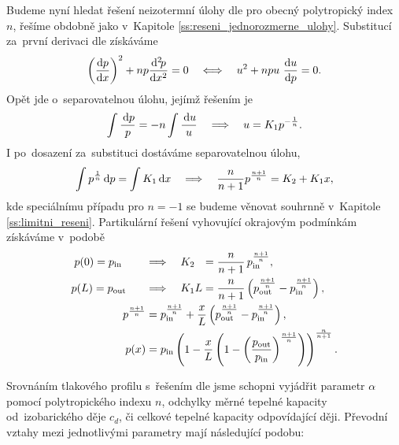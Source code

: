 Budeme nyní hledat řešení neizotermní úlohy dle  pro obecný polytropický index $n$, řešíme obdobně jako v~Kapitole \ref{ss:reseni_jednorozmerne_ulohy}. Substitucí za~první derivaci dle  získáváme
\begin{equation}
    \left(\frac{\mathrm{d} p}{\mathrm{d} x}\right)^2 + n p\frac{\mathrm{d}^2 \! p}{\mathrm{d} x^2}=0\quad\Longleftrightarrow\quad u^2 + n p u~\frac{\mathrm{d} u}{\mathrm{d} p}=0.
\end{equation}
Opět jde o~separovatelnou úlohu, jejímž řešením je
\begin{equation}
    \int \frac{\,\mathrm{d}{p}}{p}=-n \int \frac{\,\mathrm{d}{u}}{u}\quad\Longrightarrow\quad u=K_1 p^{-\frac{1}{n}}.
\end{equation}
I po~dosazení za~substituci dostáváme separovatelnou úlohu,
\begin{equation}
    \int p^{\frac{1}{n}}\,\mathrm{d}{p}=\int K_1 \,\mathrm{d}{x}\quad\Longrightarrow \quad
    \frac{n}{n+1}p^{\frac{n+1}{n}}=K_2 + K_1 x,
\end{equation}
kde speciálnímu případu pro $n=-1$ se budeme věnovat souhrnně v~Kapitole \ref{ss:limitni_reseni}.
Partikulární řešení vyhovující okrajovým podmínkám získáváme v~podobě
\begin{subequations}
    \begin{align}
        p(0)=p_{\mathrm{in\hphantom{out}}}\quad&\Longrightarrow\quad {K_2 \hphantom{L}}
        =\frac{n}{n+1}\,p_{\mathrm{in}}^{\frac{n+1}{n}},\\
        p(L)=p_{\mathrm{out\hphantom{in}}}\quad&\Longrightarrow\quad K_1 L
        =\frac{n}{n+1}\left( p_{\mathrm{out}}^{\frac{n+1}{n}}-p_{\mathrm{in}}^{\frac{n+1}{n}}\right),
        \\
        p^{\frac{n+1}{n}}&=
        p_{\mathrm{in}}^{\frac{n+1}{n}} + \frac{x}{L} \left( p_{\mathrm{out}}^{\frac{n+1}{n}}-p_{\mathrm{in}}^{\frac{n+1}{n}}\right),
        \\
        p(x)&=
        p_{\mathrm{in}}\left(1-\frac{x}{L}\left(1-\left(\frac{p_{\mathrm{out}}}{p_{\mathrm{in}}}\right)^{\frac{n+1}{n}}\right)\right)^{\frac{n}{n+1}}.
    \end{align}
\end{subequations}

Srovnáním tlakového profilu s~řešením dle  jsme schopni vyjádřit parametr $\alpha$ pomocí polytropického indexu $n$, odchylky měrné tepelné kapacity od~izobarického děje $c_d$, či celkové tepelné kapacity odpovídající ději. Převodní vztahy mezi jednotlivými parametry mají následující podobu:

